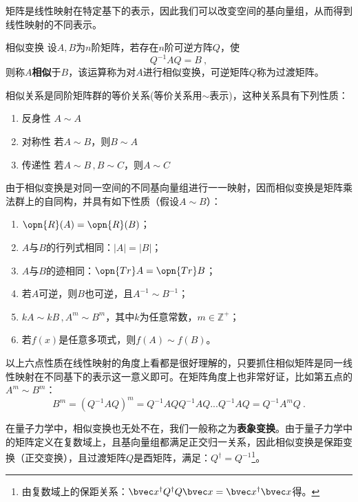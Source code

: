 
\begin{issues}
\issueDraft
\end{issues}


矩阵是线性映射在特定基下的表示，因此我们可以改变空间的基向量组，从而得到线性映射的不同表示。
\begin{definition}{相似变换}\label{def_MatSim_1}
设$A,B$为$n$阶矩阵，若存在$n$阶可逆方阵$Q$，使
\begin{equation}
Q^{-1}AQ=B~,
\end{equation}
则称$A$\textbf{相似}于$B$，该运算称为对$A$进行相似变换，可逆矩阵$Q$称为过渡矩阵。
\end{definition}
相似关系是同阶矩阵群的等价关系(等价关系用$\sim $表示)，这种关系具有下列性质：

\begin{enumerate}
\item 反身性 $A\sim A$ 
\item 对称性 若$A\sim B$，则$B\sim A$
\item 传递性 若$A\sim B\,,B\sim C$，则$A\sim C$
\end{enumerate}
由于相似变换是对同一空间的不同基向量组进行一一映射，因而相似变换是矩阵乘法群上的自同构，并具有如下性质（假设$A\sim B$）：
\begin{enumerate}
\item $\opn{R}(A)=\opn{R}(B)$；
\item $A$与$B$的行列式相同：$|A|=|B|$；
\item $A$与$B$的迹相同：$\opn{Tr}A=\opn{Tr}B$；
\item 若$A$可逆，则$B$也可逆，且$A^{-1}\sim B^{-1}$；
\item $kA\sim kB\,,A^m\sim B^m$，其中$k$为任意常数，$m\in \mathbb Z^{+}$；
\item 若$f(x)$是任意多项式，则$f(A)\sim f(B)$。
\end{enumerate}
以上六点性质在线性映射的角度上看都是很好理解的，只要抓住相似矩阵是同一线性映射在不同基下的表示这一意义即可。在矩阵角度上也非常好证，比如第五点的$A^m\sim B^m$：\begin{equation}
B^m=(Q^{-1}AQ)^m=Q^{-1}AQQ^{-1}AQ...Q^{-1}AQ=Q^{-1}A^mQ~.
\end{equation}

在量子力学中，相似变换也无处不在，我们一般称之为\textbf{表象变换}。由于量子力学中的矩阵定义在复数域上，且基向量组都满足正交归一关系，因此相似变换是保距变换（正交变换），且过渡矩阵$Q$是酉矩阵，满足：$Q^{\dagger}=Q^{-1}$\footnote{由复数域上的保距关系：$\bvec x^{\dagger}Q^{\dagger}Q\bvec x=\bvec x^{\dagger}\bvec x$得。}。


